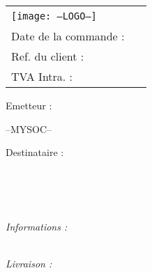 \documentclass[a4paper, oneside, 10pt, french]{article}
\begin{document}
\begin{tabular}{p{9cm} p{8cm}}
    \vspace{0pt} 
    \texttt{[image: --LOGO--]}
    & 
    \vspace{0pt}
   \raggedleft
	\textcolor{violet}{\textsc{\Large \jsonTitleValue \  \jsonRefValue}}\\
	Date de la commande : \jsonDatecValue\\
	Ref. du client : \jsonRefClientValue\\
	TVA Intra. : \jsonToValueTva ~\\
\end{tabular}


\begin{minipage}[t]{0.40\textwidth}
{\small Emetteur :}\\
\begin{fminipage}
--MYSOC--
\end{fminipage}
\end{minipage}
\hspace{1cm}
\begin{minipage}[t]{0.52\textwidth}
{\small Destinataire :}

\begin{fminipage}
\textbf{\large \jsonToValueName}\\
\jsonToValueAddressStreet\\
\textsc{\jsonToValueAddressZip \ \jsonToValueAddressCity}\\
\begin{minipage}{\textwidth}
\flushright
{\tiny \jsonToValueCodeClient}
\end{minipage}
\end{fminipage}
\end{minipage}

\begin{minipage}[t]{0.60\textwidth}
{\small \it Informations :}\\
\jsonNotesValue \\
\end{minipage}
\hspace{1cm}
\begin{minipage}[t]{0.32\textwidth}
\begin{flushright}
{\it Livraison : \jsonDeliveryModeValue}
\end{flushright}
\end{minipage}
\end{document}
